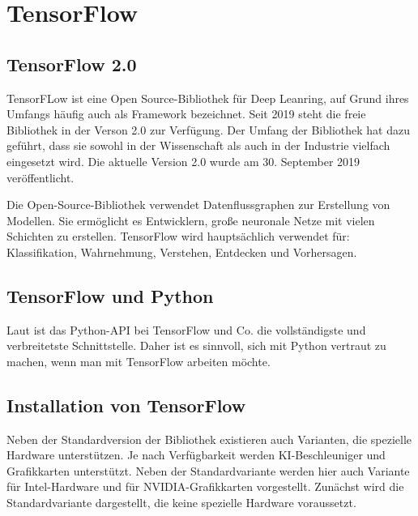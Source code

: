 %
%
%



\chapter{TensorFlow} \label{Kapitel_TF}

\section{TensorFlow 2.0} 
 
TensorFLow ist eine Open Source-Bibliothek für Deep Leanring, auf Grund ihres Umfangs häufig auch als Framework bezeichnet. Seit 2019 steht die freie Bibliothek in der Verson 2.0 zur Verfügung. Der Umfang der Bibliothek hat dazu geführt, dass sie sowohl in der Wissenschaft als auch in der Industrie vielfach eingesetzt wird. Die aktuelle Version 2.0 wurde am 30. September 2019 veröffentlicht.
 \cite{TensorFlow.02.12.2020}

Die Open-Source-Bibliothek verwendet Datenflussgraphen zur Erstellung von Modellen.  Sie ermöglicht es Entwicklern, große neuronale Netze mit vielen Schichten zu erstellen. TensorFlow wird hauptsächlich verwendet für: Klassifikation, Wahrnehmung, Verstehen, Entdecken und Vorhersagen. \cite{GoogleTensorFlow:2019} %

\section{TensorFlow und Python}

Laut \cite{Heise:2020} ist das Python-API bei TensorFlow und Co. die vollständigste und verbreitetste Schnittstelle. Daher ist es sinnvoll, sich mit Python vertraut zu machen, wenn man mit TensorFlow arbeiten möchte. 




\section{Installation von TensorFlow}

Neben der Standardversion der Bibliothek existieren auch Varianten, die spezielle Hardware unterstützen. Je nach Verfügbarkeit werden KI-Beschleuniger und Grafikkarten unterstützt. Neben der Standardvariante werden hier auch Variante für Intel-Hardware und für NVIDIA-Grafikkarten vorgestellt. Zunächst wird die Standardvariante dargestellt, die keine spezielle Hardware voraussetzt.



